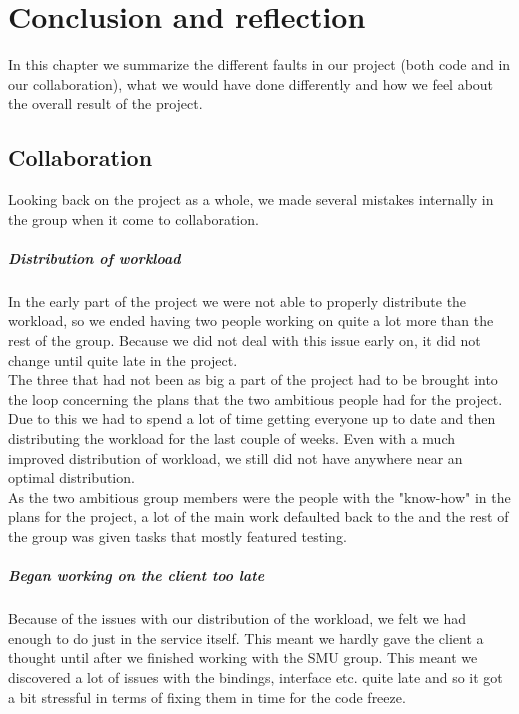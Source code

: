 \chapter{Conclusion and reflection}
\label{Conclusion}
In this chapter we summarize the different faults in our project (both code and in our collaboration), what we would have done differently and how we feel about the overall result of the project.

\section{Collaboration}
\label{Conclusion_Collaboration}
Looking back on the project as a whole, we made several mistakes internally in the group when it come to collaboration.

\paragraph{Distribution of workload}In the early part of the project we were not able to properly distribute the workload, so we ended having two people working on quite a lot more than the rest of the group. Because we did not deal with this issue early on, it did not change until quite late in the project. 
\\The three that had not been as big a part of the project had to be brought into the loop concerning the plans that the two ambitious people had for the project. Due to this we had to spend a lot of time getting everyone up to date and then distributing the workload for the last couple of weeks. Even with a much improved distribution of workload, we still did not have anywhere near an optimal distribution.
\\As the two ambitious group members were the people with the "know-how" in the plans for the project, a lot of the main work defaulted back to the and the rest of the group was given tasks that mostly featured testing.

\paragraph{Began working on the client too late} Because of the issues with our distribution of the workload, we felt we had enough to do just in the service itself. This meant we hardly gave the client a thought until after we finished working with the SMU group. This meant we discovered a lot of issues with the bindings, interface etc. quite late and so it got a bit stressful in terms of fixing them in time for the code freeze.

